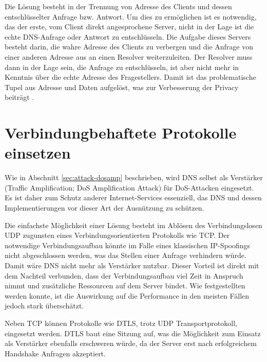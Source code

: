 Die Lösung besteht in der Trennung von Adresse des Clients und dessen entschlüsselter Anfrage bzw. Antwort. Um dies zu ermöglichen ist es notwendig, das der erste, vom Client direkt angesprochene Server, nicht in der Lage ist die echte DNS-Anfrage oder Antwort zu entschlüsseln. Die Aufgabe dieses Servers besteht darin, die wahre Adresse des Clients zu verbergen und die Anfrage von einer anderen Adresse aus an einen Resolver weiterzuleiten. Der Resolver muss dann in der Lage sein, die Anfrage zu entschlüsseln, ist aber nicht mehr in Kenntnis über die echte Adresse des Fragestellers. Damit ist das problematische Tupel aus Adresse und Daten aufgelöst, was zur Verbesserung der Privacy beiträgt \cite{Schmitt2018}.

\section{Verbindungbehaftete Protokolle einsetzen}
\label{sec:goals-trafficamp}
Wie in Abschnitt \ref{sec:attack-dosamp} beschrieben, wird DNS selbst als Verstärker (Traffic Amplification; DoS Amplification Attack) für DoS-Attacken eingesetzt. Es ist daher zum Schutz anderer Internet-Services essenziell, das DNS und dessen Implementierungen vor dieser Art der Ausnützung zu schützen.

Die einfachste Möglichkeit einer Lösung besteht im Ablösen des Verbindungslosen UDP zugunsten eines Verbindungsorientierten Protokolls wie TCP. Der notwendige Verbindungsaufbau könnte im Falle eines klassischen IP-Spoofings nicht abgeschlossen werden, was das Stellen einer Anfrage verhindern würde. Damit wäre DNS nicht mehr als Verstärker nutzbar. Dieser Vorteil ist direkt mit dem Nachteil verbunden, dass der Verbindungsaufbau viel Zeit in Anspruch nimmt und zusätzliche Ressourcen auf dem Server bindet. Wie festgestellten werden konnte, ist die Auswirkung auf die Performance in den meisten Fällen jedoch stark überschätzt\cite{Zhu2015}.

Neben TCP können Protokolle wie DTLS, trotz UDP Transportprotokoll, eingesetzt werden. DTLS baut eine Sitzung auf, was die Möglichkeit zum Einsatz als Verstärker ebenfalls erschweren würde, da der Server erst nach erfolgreichem Handshake Anfragen akzeptiert\cite{rfc6347}. 
